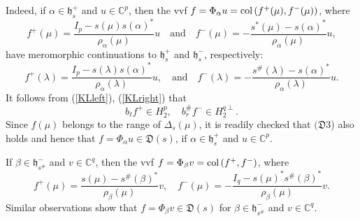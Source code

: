 \documentclass[12pt,twoside,a4paper]{amsart}
\theoremstyle{definition}
\numberwithin{equation}{section}
\begin{document}
Indeed, if $\alpha\in {{\mathfrak h}}^+_s$ and $u\in {{\mathbb C}}^p$, then the vvf
$f=\Phi_\alpha u=\textup{col}\,(f^+(\mu), f^-(\mu))$, where
\begin{equation}\label{eq:1.33}
   f^+(\mu)=\frac{I_p-s(\mu)s(\alpha)^*}{\rho_{\alpha}(\mu) }
u\quad\textrm{and}\quad
      f^-(\mu)=-\frac{s^*(\mu)-s(\alpha)^*}{{\rho_{\alpha}(\mu)}}u,
\end{equation}
have meromorphic continuations to ${{\mathfrak h}}^+_s$ and ${{\mathfrak h}}^-_s$,
respectively:
$$
f^+{(\lambda)}=\frac{I_p-s(\lambda)s(\alpha)^*}{\rho_{\alpha}(\lambda)}u,
\quad\textrm{and}\quad
f^-{(\lambda)}=-\frac{s^\#(\lambda)-s(\alpha)^*}{\rho_{\alpha}(\lambda)}u.
$$
It follows from (\ref{KLleft}), (\ref{KLright}) that
$$
b_\ell f^+\in H^p_2,\quad b^\#_r f^-\in H^{q\perp}_2.
$$
Since $f(\mu)$ belongs to the range of $\Delta_s(\mu)$, it is readily
checked that
$({{\mathfrak D}}3$) also holds and hence that $f=\Phi_\alpha u\in{{\mathfrak D}}(s)$, if
$\alpha\in {{\mathfrak h}}^+_s$
and $u\in {\mathbb{C}}^p$.

If $\beta\in {{\mathfrak h}}^-_{s^\#}$ and $v\in{\mathbb{C}}^q$, then the vvf $f=\Phi_\beta v=
\textup{col}\,(f^+ , f^-)$, where
\begin{equation}\label{eq:1.34}
f^+(\mu)=\frac{s(\mu)-s^\#(\beta)^*}{\rho_\beta(\mu)} v,\quad
f^-(\mu)=-\frac{I_q-s(\mu)^*s^\#(\beta)^*}{\rho_\beta(\mu)} v.
\end{equation}
Similar observations show that $f=\Phi_\beta v\in {{\mathfrak D}}(s)$ for
$\beta\in {{\mathfrak h}}^-_{s^\#}$ and $v\in{\mathbb{C}}^q$.
\end{document}
